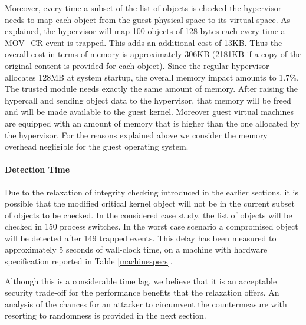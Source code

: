 Moreover, every time a subset of the list of objects is checked the hypervisor needs to map each object from the guest physical space to its virtual space. As explained, the hypervisor will map 100 objects of 128 bytes each every time a MOV\_CR event is trapped. This adds an additional cost of 13KB. Thus the overall cost in terms of memory is approximately 306KB (2181KB if a copy of the original content is provided for each object). 
Since the regular hypervisor allocates 128MB at system startup, the overall memory impact amounts to 1.7\%. 
The trusted module needs exactly the same amount of memory. After raising the hypercall and sending object data to the hypervisor, that memory will be freed and will be made available to the guest kernel. 
Moreover guest virtual machines are equipped with an amount of memory that is higher than the one allocated by the hypervisor. For the reasons explained above we consider the memory overhead negligible for the guest operating system.
 

\paragraph{Detection Time}
Due to the relaxation of integrity checking introduced in the earlier sections, it is possible that the modified critical kernel object will not be in the current subset of objects to be checked. In the considered case study, the list of objects will be checked in 150 process switches. In the worst case scenario a compromised object will be detected after 149 trapped events. This delay has been measured to approximately 5 seconds of wall-clock time, on a machine with hardware specification reported in Table \ref{machinespecs}. 

Although this is a considerable time lag, we believe that it is an acceptable security trade-off for the performance benefits that the relaxation offers. An analysis of the chances for an attacker to circumvent the countermeasure with resorting to randomness is provided in the next section. 

